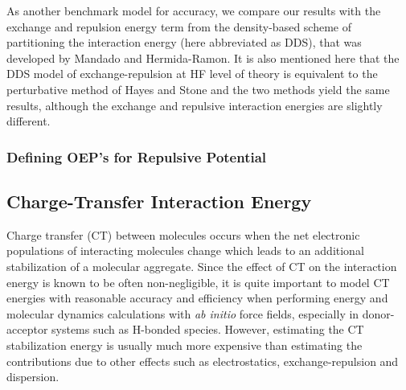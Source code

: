 As another benchmark model for accuracy, we compare our results with 
the exchange and repulsion energy term 
from the density\hyp{}based scheme of partitioning the interaction energy
(here abbreviated as DDS),
that was developed by Mandado and Hermida-Ramon. 
% 
It is also mentioned here that the DDS model of exchange-repulsion at HF level of theory
is equivalent to the perturbative method of Hayes and Stone and the two methods
yield the same results, although the exchange and repulsive interaction energies
are slightly different.

\subsubsection{\label{ssdff.sd}Defining OEP's for Repulsive Potential}

\subsection{\label{ss.5.2}Charge-Transfer Interaction Energy}

Charge transfer (CT) between molecules occurs when the net electronic populations 
of interacting molecules change which leads to an additional stabilization 
of a molecular aggregate. Since the effect of CT on the interaction energy 
is known to be often non\hyp{}negligible, it is quite important to model 
CT energies with reasonable accuracy and efficiency when performing energy 
and molecular dynamics calculations with \emph{ab initio} force fields, 
especially in donor\hyp{}acceptor systems such as H\hyp{}bonded species. 
However, estimating the CT stabilization energy is usually much more expensive 
than estimating the contributions due to other effects such as electrostatics, 
exchange\hyp{}repulsion and dispersion.\cite{Gordon.Fedorov.Pruitt.Slipchenko.ChemRev.2012}

